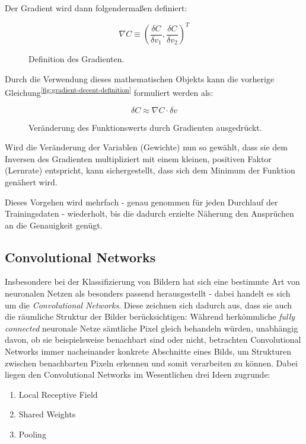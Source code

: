 Der Gradient wird dann folgendermaßen definiert:

\begin{figure}[h]
    \centering
    \[ \nabla C \equiv
        (\frac{\delta C}{\delta v_1},\frac{\delta C}{\delta v_2})^T
    \]
    \caption{Definition des Gradienten.}
    \label{fig:gradient-decent-definition-2}
\end{figure}

Durch die Verwendung dieses mathematischen Objekts kann die vorherige Gleichung\textsuperscript{\ref{fig:gradient-decent-definition}} formuliert werden als:

\begin{figure}[h]
    \centering
    \[ \delta C \approx
        \nabla C \cdot \delta v
    \]
    \caption{Veränderung des Funktionswerts durch Gradienten ausgedrückt.}
    \label{fig:gradient-decent-definition-3}
\end{figure}

Wird die Veränderung der Variablen (Gewichte) nun so gewählt, dass sie dem Inversen des Gradienten multipliziert mit
einem kleinen, positiven Faktor (Lernrate) entspricht, kann sichergestellt, dass sich dem Minimum der Funktion
genähert wird.

Dieses Vorgehen wird mehrfach - genau genommen für jeden Durchlauf der Trainingsdaten - wiederholt, bis die dadurch erzielte Näherung den
Ansprüchen an die Genauigkeit genügt.

\subsection{Convolutional Networks}

Insbesondere bei der Klassifizierung von Bildern hat sich eine bestimmte Art von neuronalen Netzen als besonders passend
herausgestellt - dabei handelt es sich um die \textit{Convolutional Networks}. Diese zeichnen sich dadurch aus,
dass sie auch die räumliche Struktur der Bilder berücksichtigen: Während herkömmliche \textit{fully connected} neuronale Netze
sämtliche Pixel gleich behandeln würden, unabhängig davon, ob sie beispielsweise benachbart sind oder nicht, betrachten
Convolutional Networks immer nacheinander konkrete Abschnitte eines Bilds, um Strukturen zwischen benachbarten Pixeln
erkennen und somit verarbeiten zu können.
Dabei liegen den Convolutional Networks im Wesentlichen drei Ideen zugrunde:

\begin{enumerate}
    \item{Local Receptive Field}
    \item{Shared Weights}
    \item{Pooling}
\end{enumerate}

